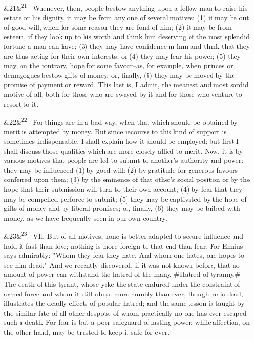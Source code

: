 \documentclass[12pt]{article}
\newcommand{\para}[1][]{\par\noindent\ifx&#1&\else\textsuperscript{\footnotesize #1}~\fi}
\begin{document}
\para[21] Whenever, then, people bestow anything upon a fellow-man to raise his estate or his dignity, it may be from any one of several motives: (1) it may be out of good-will, when for some reason they are fond of him; (2) it may be from esteem, if they look up to his worth and think him deserving of the most splendid fortune a man can have; (3) they may have confidence in him and think that they are thus acting for their own interests; or (4) they may fear his power; (5) they may, on the contrary, hope for some favour--as, for example, when princes or demagogues bestow gifts of money; or, finally, (6) they may be moved by the promise of payment or reward. This last is, I admit, the meanest and most sordid motive of all, both for those who are swayed by it and for those who venture to resort to it.

\para[22] For things are in a bad way, when that which should be obtained by merit is attempted by money. But since recourse to this kind of support is sometimes indispensable, I shall explain how it should be employed; but first I shall discuss those qualities which are more closely allied to merit. Now, it is by various motives that people are led to submit to another's authority and power: they may be influenced (1) by good-will; (2) by gratitude for generous favours conferred upon them; (3) by the eminence of that other's social position or by the hope that their submission will turn to their own account; (4) by fear that they may be compelled perforce to submit; (5) they may be captivated by the hope of gifts of money and by liberal promises; or, finally, (6) they may be bribed with money, as we have frequently seen in our own country.

\para[23] VII. But of all motives, none is better adapted to secure influence and hold it fast than love; nothing is more foreign to that end than fear. For Ennius says admirably: "Whom they fear they hate. And whom one hates, one hopes to see him dead." And we recently discovered, if it was not known before, that no amount of power can withstand the hatred of the many. \#Hatred of tyranny.\# The death of this tyrant, whose yoke the state endured under the constraint of armed force and whom it still obeys more humbly than ever, though he is dead, illustrates the deadly effects of popular hatred; and the same lesson is taught by the similar fate of all other despots, of whom practically no one has ever escaped such a death. For fear is but a poor safeguard of lasting power; while affection, on the other hand, may be trusted to keep it safe for ever.
\end{document}
